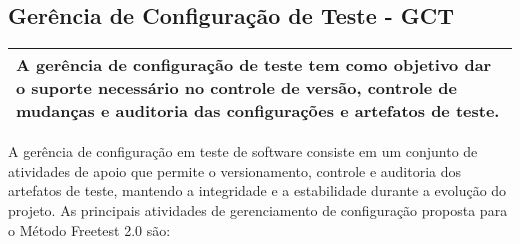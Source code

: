 




\subsection{ Gerência de Configuração de Teste - GCT }
\label{sec:gct}

\begin{table}[!ht]
\centering
\begin{tabular}{|p{130mm}|}
\hline
A gerência de configuração de teste tem como objetivo dar o suporte necessário no controle de versão, controle de mudanças e auditoria das configurações e artefatos de teste. \\ 
\hline
\end{tabular}
\end{table}

A gerência de configuração em teste de software consiste em um conjunto de atividades de apoio que permite o versionamento, controle e auditoria dos artefatos de teste, mantendo a integridade e a estabilidade durante a evolução do projeto. As principais atividades de gerenciamento de configuração proposta para o Método Freetest 2.0 são:


